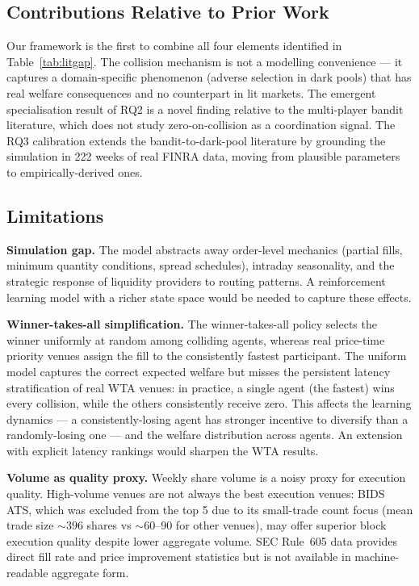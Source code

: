 \documentclass[11pt]{article}
\begin{document}
\subsection{Contributions Relative to Prior Work}

Our framework is the first to combine all four elements identified in
Table~\ref{tab:litgap}.
The collision mechanism is not a modelling convenience --- it captures a
domain-specific phenomenon (adverse selection in dark pools) that has
real welfare consequences and no counterpart in lit markets.
The emergent specialisation result of RQ2 is a novel finding relative to
the multi-player bandit literature, which does not study zero-on-collision
as a coordination signal.
The RQ3 calibration extends the bandit-to-dark-pool literature by grounding
the simulation in 222 weeks of real FINRA data, moving from plausible
parameters to empirically-derived ones.

\subsection{Limitations}

\textbf{Simulation gap.} The model abstracts away order-level mechanics
(partial fills, minimum quantity conditions, spread schedules), intraday
seasonality, and the strategic response of liquidity providers to routing
patterns. A reinforcement learning model with a richer state space would
be needed to capture these effects.

\textbf{Winner-takes-all simplification.}
The winner-takes-all policy selects the winner uniformly at random among
colliding agents, whereas real price-time priority venues assign the fill
to the consistently fastest participant.
The uniform model captures the correct expected welfare but misses the
persistent latency stratification of real WTA venues: in practice,
a single agent (the fastest) wins every collision, while the others
consistently receive zero.
This affects the learning dynamics --- a consistently-losing agent has
stronger incentive to diversify than a randomly-losing one --- and
the welfare distribution across agents.
An extension with explicit latency rankings would sharpen the WTA results.

\textbf{Volume as quality proxy.} Weekly share volume is a noisy proxy for
execution quality. High-volume venues are not always the best execution
venues: BIDS ATS, which was excluded from the top 5 due to its small-trade
count focus (mean trade size $\sim 396$ shares vs $\sim 60$--$90$ for other
venues), may offer superior block execution quality despite lower aggregate
volume.
SEC Rule~605 data provides direct fill rate and price improvement
statistics but is not available in machine-readable aggregate form.
\end{document}
